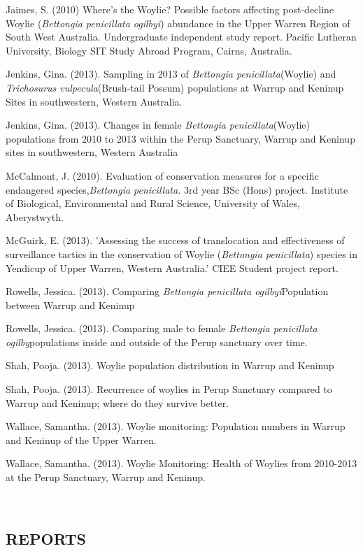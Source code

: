 \documentclass[version=last,
    paper=a4,                               %
    10pt,                                   %
    dvipsnames,
    oneside,                              %
    headings=openany,                       %
    open=any,
    BCOR=7mm,                               %
    DIV=15,     %
]{scrbook}
\begin{document}
Jaimes, S. (2010) Where's the Woylie? Possible factors affecting
post-decline Woylie (\emph{Bettongia penicillata ogilbyi}) abundance in
the Upper Warren Region of South West Australia. Undergraduate
independent study report. Pacific Lutheran University, Biology SIT Study
Abroad Program, Cairns, Australia.

Jenkins, Gina. (2013). Sampling in 2013 of \emph{Bettongia
penicillata}(Woylie) and \emph{Trichosurus vulpecula}(Brush-tail Possum)
populations at Warrup and Keninup Sites in southwestern, Western
Australia.

Jenkins, Gina. (2013). Changes in female \emph{Bettongia
penicillata}(Woylie) populations from 2010 to 2013 within the Perup
Sanctuary, Warrup and Keninup sites in southwestern, Western Australia

McCalmont, J. (2010). Evaluation of conservation measures for a specific
endangered species,\emph{Bettongia penicillata.} 3rd year BSc (Hons)
project. Institute of Biological, Environmental and Rural Science,
University of Wales, Aberystwyth.

McGuirk, E. (2013). 'Assessing the success of translocation and
effectiveness of surveillance tactics in the conservation of Woylie
(\emph{Bettongia penicillata}) species in Yendicup of Upper Warren,
Western Australia.' CIEE Student project report.

Rowells, Jessica. (2013). Comparing \emph{Bettongia penicillata
ogilbyi}Population between Warrup and Keninup

Rowells, Jessica. (2013). Comparing male to female \emph{Bettongia
penicillata ogilby}populations inside and outside of the Perup sanctuary
over time.

Shah, Pooja. (2013). Woylie population distribution in Warrup and
Keninup

Shah, Pooja. (2013). Recurrence of woylies in Perup Sanctuary compared
to Warrup and Keninup; where do they survive better.

Wallace, Samantha. (2013). Woylie monitoring: Population numbers in
Warrup and Keninup of the Upper Warren.

Wallace, Samantha. (2013). Woylie Monitoring: Health of Woylies from
2010-2013 at the Perup Sanctuary, Warrup and Keninup.

~

\subsection{REPORTS}
\end{document}
